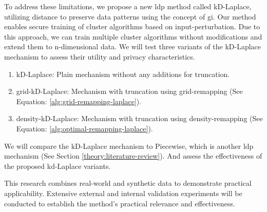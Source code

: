 To address these limitations, we propose a new \gls{ldp} method called kD-Laplace, utilizing distance to preserve data patterns using the concept of \gls{gi}. \newline
Our method enables secure training of cluster algorithms based on input-perturbation.
Due to this approach, we can train multiple cluster algorithms without modifications and extend them to n-dimensional data.
We will test three variants of the kD-Laplace mechanism to assess their utility and privacy characteristics.
\begin{enumerate}
      \item kD-Laplace: Plain mechanism without any additions for truncation.
      \item grid-kD-Laplace: Mechanism with truncation using grid-remapping (See Equation: \ref{alg:grid-remapping-laplace}).
      \item density-kD-Laplace: Mechanism with truncation using density-remapping (See Equation: \ref{alg:optimal-remapping-laplace}).
\end{enumerate}
We will compare the kD-Laplace mechanism to Piecewise, which is another \gls{ldp} mechanism (See Section \ref{theory:literature-review}).
And assess the effectiveness of the proposed kd-Laplace variants.

This research combines real-world and synthetic data to demonstrate practical applicability.
Extensive external and internal validation experiments will be conducted to establish the method's practical relevance and effectiveness.



